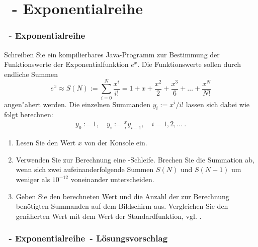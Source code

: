 \def\stitle{\theexercise\ - Exponentialreihe}
\section{\stitle}
\begin{frame}%
  \frametitle{\stitle}%


Schreiben Sie ein kompilierbares Java-Programm zur Bestimmung der Funktionswerte der Exponentialfunktion $e^x$.
Die Funktionswerte sollen durch endliche Summen
\[
  e^x \approx S(N):=\sum_{i=0}^{N} \frac{x^i}{i!}=
  1+x+\frac{x^2}{2}+\frac{x^3}{6}+\ldots+\frac{x^N}{N!}
\]
angen"ahert werden.
Die einzelnen Summanden $y_i := x^i/i! $ lassen sich dabei wie folgt berechnen: 
\begin{align*}
  y_0 := 1, \quad 
  y_i := \frac{x}{i}y_{i-1}, \quad i = 1,2,\ldots \ .
\end{align*}

\begin{enumerate}
  \item Lesen Sie den Wert $x$ von der Konsole ein.
  \item Verwenden Sie zur Berechnung eine -Schleife.
        Brechen Sie die Summation ab, wenn sich zwei aufeinanderfolgende Summen $S(N)$ und $S(N+1)$ um weniger als $10^{-12}$ voneinander unterscheiden.
  \item Geben Sie den berechneten Wert und die Anzahl der zur Berechnung ben\"otigten Summanden auf dem Bildschirm aus.
        Vergleichen Sie den gen\"aherten Wert mit dem Wert der Standardfunktion, vgl. .
\end{enumerate}
\end{frame}


\begin{frame}%
  \frametitle{\stitle\ - L\"osungsvorschlag}%

\end{frame}
